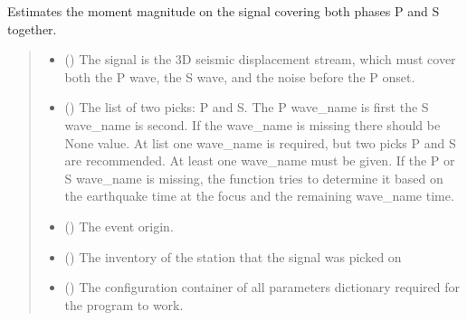 \documentclass[letterpaper,10pt,english]{sphinxmanual}
\begin{document}
\begin{fulllineitems}
\label{\detokenize{api_support:amw.mw.double_phase_mw.estimate_double_phase_mw}}
\pysigstartsignatures
{}
\pysigstopsignatures
\sphinxAtStartPar
Estimates the moment magnitude on the signal covering both phases P and S together.
\begin{quote}\begin{description}
\begin{itemize}
\item {} 
\sphinxAtStartPar
{} () \textendash{} The signal is the 3D seismic displacement stream, which must cover both the P wave, the S wave,
and the noise before the P onset.

\item {} 
\sphinxAtStartPar
{} (\sphinxstyleliteralemphasis{\sphinxupquote{(}}\sphinxstyleliteralemphasis{\sphinxupquote{)}}) \textendash{} The list of two picks: P and S. The P wave\_name is first the S wave\_name is second.
If the wave\_name is missing there should be None value. At list one wave\_name is required,
but two picks P and S are recommended. At least one wave\_name must be given. If the P or S wave\_name is missing,
the function tries to determine it based on the earthquake time at the focus and the remaining wave\_name time.

\item {} 
\sphinxAtStartPar
{} () \textendash{} The event origin.

\item {} 
\sphinxAtStartPar
{} () \textendash{} The inventory of the station that the signal was picked on

\item {} 
\sphinxAtStartPar
{} () \textendash{} The configuration container of all parameters dictionary required for the program to work.


\end{itemize}
\end{description}
\end{quote}
\end{fulllineitems}
\end{document}
